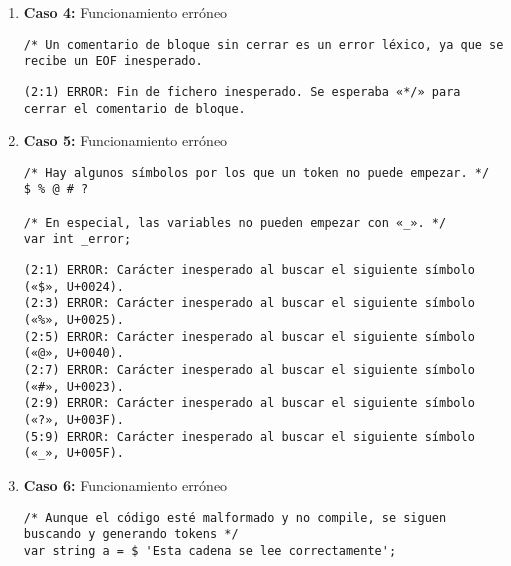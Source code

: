 \begin{enumerate}
    
    \item \textbf{Caso 4:} Funcionamiento erróneo
    \begin{tcolorbox}[title={Código fuente}, colback=white]
        \begin{lstlisting}
/* Un comentario de bloque sin cerrar es un error léxico, ya que se recibe un EOF inesperado.
        \end{lstlisting}      
    \end{tcolorbox}

    \begin{tcolorbox}[title={Errores detectados}, colback=white]
        \begin{lstlisting}
(2:1) ERROR: Fin de fichero inesperado. Se esperaba «*/» para cerrar el comentario de bloque.
        \end{lstlisting}
    \end{tcolorbox}


    \item \textbf{Caso 5:} Funcionamiento erróneo
    \begin{tcolorbox}[title={Código fuente}, colback=white]
        \begin{lstlisting}
/* Hay algunos símbolos por los que un token no puede empezar. */
$ % @ # ?

/* En especial, las variables no pueden empezar con «_». */
var int _error;
        \end{lstlisting}      
    \end{tcolorbox}

    \begin{tcolorbox}[title={Errores detectados}, colback=white]
        \begin{lstlisting}
(2:1) ERROR: Carácter inesperado al buscar el siguiente símbolo («$», U+0024).
(2:3) ERROR: Carácter inesperado al buscar el siguiente símbolo («%», U+0025).
(2:5) ERROR: Carácter inesperado al buscar el siguiente símbolo («@», U+0040).
(2:7) ERROR: Carácter inesperado al buscar el siguiente símbolo («#», U+0023).
(2:9) ERROR: Carácter inesperado al buscar el siguiente símbolo («?», U+003F).
(5:9) ERROR: Carácter inesperado al buscar el siguiente símbolo («_», U+005F).
        \end{lstlisting}
    \end{tcolorbox}

    
    \item \textbf{Caso 6:} Funcionamiento erróneo
    \begin{tcolorbox}[title={Código fuente}, colback=white]
        \begin{lstlisting}
/* Aunque el código esté malformado y no compile, se siguen buscando y generando tokens */
var string a = $ 'Esta cadena se lee correctamente';


\end{lstlisting}
\end{tcolorbox}
\end{enumerate}
